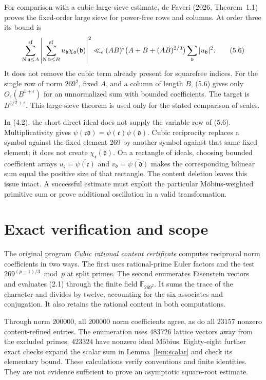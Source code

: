\documentclass[11pt]{article}
\newcommand{\N}{\operatorname N}
\begin{document}
For comparison with a cubic large-sieve estimate,
de Faveri (2026, Theorem~1.1) proves the fixed-order large sieve
for power-free rows and columns. At order three its bound is
\[
 \sum_{\N\mathfrak a\le A}^{\rm sf}
 \left|\sum_{\N\mathfrak b\le B}^{\rm sf}
       u_{\mathfrak b}\chi_{\mathfrak a}(\mathfrak b)\right|^2
 \ll_\epsilon(AB)^\epsilon
       \bigl(A+B+(AB)^{2/3}\bigr)\sum_{\mathfrak b}|u_{\mathfrak b}|^2.
                                                        \tag{5.6}
\]
It does not remove the cubic term already present for squarefree
indices. For the single row of norm $269^2$, fixed $A$, and
a column of length $B$, (5.6) gives only
$O_\epsilon(B^{1+\epsilon})$ for an unnormalized sum with
bounded coefficients. The target is $B^{1/2+\epsilon}$.
This large-sieve theorem is used only for the stated comparison of scales.

In (4.2), the short direct ideal does not supply the variable
row of (5.6). Multiplicativity gives
$\psi(\mathfrak c\mathfrak d)=\psi(\mathfrak c)\psi(\mathfrak d)$.
Cubic reciprocity replaces a symbol against the fixed element
269 by another symbol against that same fixed element; it
does not create $\chi_{\mathfrak c}(\mathfrak d)$.
On a rectangle of ideals, choosing bounded coefficient arrays
$u_{\mathfrak c}=\overline{\psi(\mathfrak c)}$ and
$v_{\mathfrak d}=\overline{\psi(\mathfrak d)}$ makes the
corresponding bilinear sum equal the positive size of that rectangle.
The content deletion leaves this issue intact.
A successful estimate must exploit the particular
M\"obius-weighted primitive sum or prove additional
oscillation in a valid transformation.

\section{Exact verification and scope}

The original program \emph{Cubic rational content certificate}
computes reciprocal norm coefficients in two ways.
The first uses rational-prime Euler factors and the test
$269^{(p-1)/3}\bmod p$ at split primes. The second enumerates
Eisenstein vectors and evaluates (2.1) through the finite field
$\mathbb F_{269^2}$. It sums the trace of the character and
divides by twelve, accounting for the six associates and
conjugation. It also retains the rational content in both
computations.

Through norm $200000$, all $200000$ norm coefficients agree,
as do all $23157$ nonzero content-refined entries.
The enumeration uses $483726$ lattice vectors away from
the excluded primes; $423324$ have nonzero ideal M\"obius.
Eighty-eight further exact checks expand the scalar sum
in Lemma~\ref{lem:scalar} and check its elementary bound.
These calculations verify conventions and finite identities.
They are not evidence sufficient to prove an asymptotic
square-root estimate.
\end{document}
